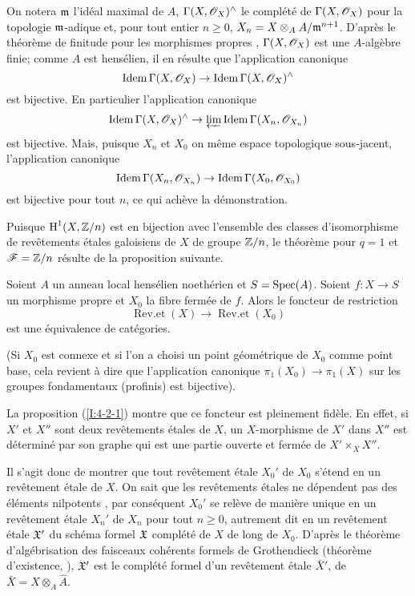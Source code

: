 \documentclass[oneside]{book}
\begin{document}
On notera $\mathfrak{m}$ l'idéal maximal de $A$, $\Gamma(X,\mathscr{O}_X)^\wedge$ le complété 
de $\Gamma(X,\mathscr{O}_X)$ pour la topologie $\mathfrak{m}$-adique et, pour tout entier 
$n\geqslant 0$, $X_n=X\otimes_A A/\mathfrak{m}^{n+1}$. D'après le théorème de finitude 
pour les morphismes propres \cite[III.3.2]{8}, $\Gamma(X,\mathscr{O}_X)$ est une 
$A$-algèbre finie; comme $A$ est hensélien, il en résulte que 
l'application canonique 
\[
  \operatorname{Idem} \Gamma(X,\mathscr{O}_X) \to \operatorname{Idem}\Gamma(X,\mathscr{O}_X)^\wedge
\]
est bijective. En particulier l'application canonique 
\[
  \operatorname{Idem} \Gamma(X,\mathscr{O}_X)^\wedge \to \varprojlim \operatorname{Idem}\Gamma(X_n,\mathscr{O}_{X_n})
\]
est bijective. Mais, puisque $X_n$ et $X_0$ on même espace topologique 
sous-jacent, l'application canonique 
\[
  \operatorname{Idem}\Gamma(X_n,\mathscr{O}_{X_n}) \to \operatorname{Idem} \Gamma(X_0,\mathscr{O}_{X_0})
\]
est bijective pour tout $n$, ce qui achève la démonstration. 

Puisque $\operatorname{H}^1(X,\mathbb{Z}/n)$ est en bijection avec l'ensemble des classes 
d'isomorphisme de revêtements étales galoisiens de $X$ de groupe $\mathbb{Z}/n$, 
le théorème  pour $q=1$ et $\mathscr{F}=\mathbb{Z}/n$ résulte de la proposition suivante. 





\begin{proposition}\label{I:4-2-2}
Soient $A$ un anneau local hensélien noethérien et $S=\operatorname{Spec}(A)$. Soient 
$f:X\to S$ un morphisme propre et $X_0$ la fibre fermée de $f$. Alors le 
foncteur de restriction 
\[
  \operatorname{Rev.et}(X) \to \operatorname{Rev.et}(X_0)
\]
est une équivalence de catégories. 
\end{proposition}

(Si $X_0$ est connexe et si l'on a choisi un point géométrique de $X_0$ 
comme point base, cela revient à dire que l'application canonique 
$\pi_1(X_0)\to \pi_1(X)$ sur les groupes fondamentaux (profinis) est 
bijective). 

La proposition (\ref{I:4-2-1}) montre que ce foncteur est pleinement fidèle. En 
effet, si $X'$ et $X''$ sont deux revêtements étales de $X$, un 
$X$-morphisme de $X'$ dans $X''$ est déterminé par son graphe qui est une 
partie ouverte et fermée de $X'\times_X X''$. 

Il s'agit donc de montrer que tout revêtement étale $X_0'$ de $X_0$ s'étend 
en un revêtement étale de $X$. On sait que les revêtements étales ne 
dépendent pas des éléments nilpotents \cite[ch.1]{7}, par conséquent 
$X_0'$ se relève de manière unique en un revêtement étale $X_n'$ de 
$X_n$ pour tout $n\geqslant 0$, autrement dit en un revêtement étale 
$\mathfrak{X}'$ du schéma formel $\mathfrak{X}$ complété de $X$ de long de $X_0$. D'après 
le théorème d'algébrisation des faisceaux cohérents formels de 
Grothendieck (théorème d'existence, \cite[III.5]{8}), $\mathfrak{X}'$ est le 
complété formel d'un revêtement étale $\bar X'$, de 
$\bar X=X\otimes_A \hat A$. 
\end{document}
